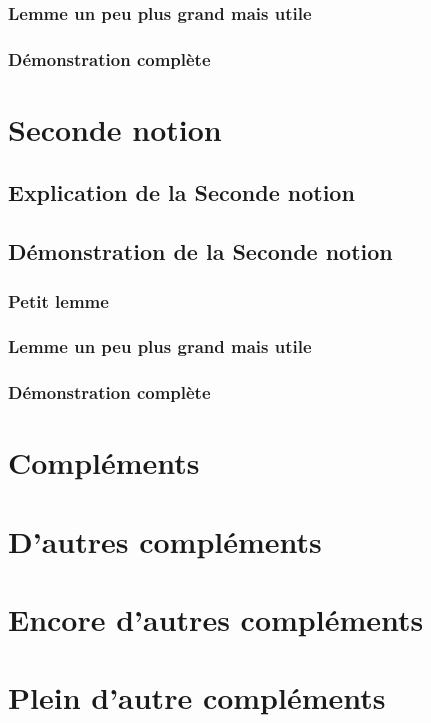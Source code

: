 \documentclass[a4paper,cours]{../texmf/tex/latex/insa/insa}
\begin{document}
				\subsection{Lemme un peu plus grand mais utile}
					\lipsum[1-4]
				\subsection{Démonstration complète}
					\lipsum[1-5]
		\chapter{Seconde notion}
			\lipsum[1-2]
			\section{Explication de la Seconde notion}
				\lipsum[1-5]
			\section{Démonstration de la Seconde notion}
				\subsection{Petit lemme}
					\lipsum[1-2]
				\subsection{Lemme un peu plus grand mais utile}
					\lipsum[1-4]
				\subsection{Démonstration complète}
					\lipsum[1-5]
	\begin{appendix}
	\chapter{Compléments}
		\lipsum[8-9]
		\chapter{D'autres compléments}
			\lipsum[52-56]
		\chapter{Encore d'autres compléments}
			\lipsum[68-92]
		\chapter{Plein d'autre compléments}
			\lipsum[105-109]
	\end{appendix}


	\makefourthcover
\end{document}
